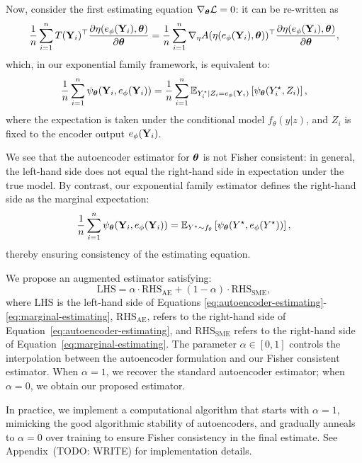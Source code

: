 \documentclass[twoside,11pt]{article}
\begin{document}
Now, consider the first estimating equation \( \nabla_{\bm{\theta}} \mathcal{L} = 0 \): it can be re-written as
\[
\frac{1}{n} \sum_{i=1}^n 
T({\bf Y}_i)^\top 
\frac{\partial \eta(e_\phi({\bf Y}_i), {\bm{\theta}})}{\partial {\bm{\theta}}}
=
\frac{1}{n} \sum_{i=1}^n 
\nabla_\eta A(\eta(e_\phi({\bf Y}_i), {\bm{\theta}}))^\top 
\frac{\partial \eta(e_\phi({\bf Y}_i), {\bm{\theta}})}{\partial {\bm{\theta}}},
\]
which, in our exponential family framework, is equivalent to:
\begin{equation}
\label{eq:autoencoder-estimating}
\frac{1}{n} \sum_{i=1}^n \psi_{\bm{\theta}}({\bf Y}_i, e_\phi({\bf Y}_i)) 
=
\frac{1}{n} \sum_{i=1}^n 
\mathbb{E}_{Y_i^\star \mid Z_i = e_\phi({\bf Y}_i)} 
\left[ \psi_{\bm{\theta}}(Y_i^\star, Z_i) \right],
\end{equation}
where the expectation is taken under the conditional model \( f_\theta(y | z) \), and \( Z_i \) is fixed to the encoder output \( e_\phi({\bf Y}_i) \).

We see that the autoencoder estimator for \( {\bm{\theta}} \) is not Fisher consistent: in general, the left-hand side does not equal the right-hand side in expectation under the true model. By contrast, our exponential family estimator defines the right-hand side as the marginal expectation:
\begin{equation}
\label{eq:marginal-estimating}
\frac{1}{n} \sum_{i=1}^n \psi_{\bm{\theta}}({\bf Y}_i, e_\phi({\bf Y}_i)) 
=
\mathbb{E}_{Y^\star \sim f_\theta} 
\left[ \psi_{\bm{\theta}}(Y^\star, e_\phi(Y^\star)) \right],
\end{equation}
thereby ensuring consistency of the estimating equation.

We propose an augmented estimator satisfying:
\[
\text{LHS} 
= \alpha \cdot \text{RHS}_{\text{AE}} 
+ (1 - \alpha) \cdot \text{RHS}_{\text{SME}},
\]
where  \( \text{LHS} \) is the left-hand side of Equations \eqref{eq:autoencoder-estimating}-\eqref{eq:marginal-estimating},  \( \text{RHS}_{\text{AE}} \), refers to the right-hand side of Equation~\eqref{eq:autoencoder-estimating}, and \( \text{RHS}_{\text{SME}} \) refers to the right-hand side of Equation~\eqref{eq:marginal-estimating}. The parameter \( \alpha \in [0, 1] \) controls the interpolation between the autoencoder formulation and our Fisher consistent estimator. When \( \alpha = 1 \), we recover the standard autoencoder estimator; when \( \alpha = 0 \), we obtain our proposed estimator.

In practice, we implement a computational algorithm that starts with \( \alpha = 1 \), mimicking the good algorithmic stability of autoencoders, and gradually anneals to \( \alpha = 0 \) over training to ensure Fisher consistency in the final estimate. See Appendix~(TODO: WRITE) for implementation details.
\end{document}
